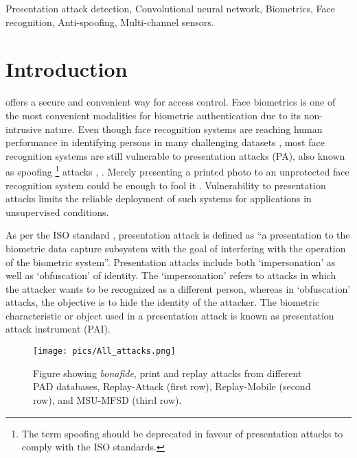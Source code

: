 \documentclass[journal]{IEEEtran}
\begin{document}
\begin{IEEEkeywords}
Presentation attack detection, Convolutional neural network, Biometrics, Face recognition, Anti-spoofing, Multi-channel sensors.
\end{IEEEkeywords}


\IEEEpeerreviewmaketitle


\section{Introduction}


 offers a secure and convenient way for access control. Face biometrics is one of the most convenient
modalities for biometric authentication due to its non-intrusive nature. Even though face recognition systems are reaching human performance in identifying persons in many challenging datasets \cite{learned2016labeled}, most face recognition systems are still vulnerable to presentation attacks (PA), also known as spoofing \footnote{The term spoofing should be deprecated in favour of presentation attacks to comply with the ISO standards.} attacks \cite{marcel2014handbook}, \cite{ISO1}. Merely presenting a printed photo to an unprotected face recognition system could be enough to fool it \cite{anjos2011counter}. Vulnerability to presentation attacks limits the reliable deployment of such systems for applications in unsupervised conditions.

As per the ISO standard \cite{ISO1}, presentation attack is defined as ``a presentation to the biometric data capture subsystem with the goal of interfering with the operation of the biometric system''. Presentation attacks include both `impersonation' as well as `obfuscation' of identity. The `impersonation' refers to attacks in which the attacker wants to be recognized as a different person, whereas in `obfuscation' attacks, the objective is to hide the identity of the attacker. The biometric characteristic or object used in a presentation attack is known as presentation attack instrument (PAI).

\begin{figure}[t]
\centering
        \texttt{[image: pics/All\_attacks.png]}
        \caption{Figure showing \textit{bonafide}, print and replay attacks from different PAD databases, Replay-Attack \cite{chingovska2012effectiveness} (first row), Replay-Mobile \cite{costa2016replay} (second row), and MSU-MFSD \cite{wen2015face} (third row).}\label{fig:example_attacks}

\end{figure}
\end{document}
